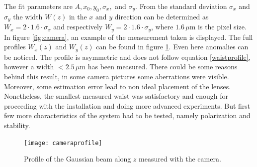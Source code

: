 The fit parameters are $A,x_0,y_0,\sigma_x,$ and $\sigma_y$. From the standard deviation $\sigma_x$ and $\sigma_y$ the width $W(z)$ in the $x$ and $y$ direction can be determined as $W_x = 2\cdot 1.6\cdot \sigma_x$ and respectively $W_y = 2\cdot 1.6\cdot \sigma_y$, where $1.6\,\mu$m is the pixel size.
In figure \ref{fig:camera}, an example of the measurement taken is displayed. The full profiles $W_x(z)$ and $W_{y}(z)$ can be found in figure \ref{cameraprofile}. Even here anomalies can be noticed. The profile is asymmetric and does not follow equation \ref{waistprofile}, however a width $<2.5\,\mu$m has been measured. There could be some reasons behind this result, in some camera pictures some aberrations were visible. Moreover, some estimation error lead to non ideal placement of the lenses. Nonetheless, the smallest measured waist was satisfactory and enough for proceeding with the installation and doing more advanced experiments. But first few more characteristics of the system had to be tested, namely polarization and stability.

\begin{figure}
\centering
\texttt{[image: cameraprofile]}
\caption{Profile of the Gaussian beam along $z$ measured with the camera.}
\label{cameraprofile}
\end{figure}

